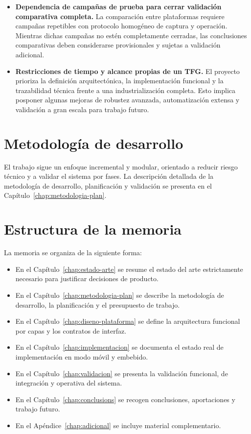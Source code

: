 \begin{itemize}
  \item \textbf{Dependencia de campañas de prueba para cerrar validación comparativa completa.}
  La comparación entre plataformas requiere campañas repetibles con protocolo homogéneo de captura y operación.
  Mientras dichas campañas no estén completamente cerradas, las conclusiones comparativas deben considerarse provisionales y sujetas a validación adicional.

  \item \textbf{Restricciones de tiempo y alcance propias de un TFG.}
  El proyecto prioriza la definición arquitectónica, la implementación funcional y la trazabilidad técnica frente a una industrialización completa.
  Esto implica posponer algunas mejoras de robustez avanzada, automatización extensa y validación a gran escala para trabajo futuro.
\end{itemize}

\section{Metodología de desarrollo}

El trabajo sigue un enfoque incremental y modular, orientado a reducir riesgo técnico y a validar el sistema por fases. La descripción detallada de la metodología de desarrollo, planificación y validación se presenta en el Capítulo~\ref{chap:metodologia-plan}.

\section{Estructura de la memoria}

La memoria se organiza de la siguiente forma:

\begin{itemize}
  \item En el Capítulo~\ref{chap:estado-arte} se resume el estado del arte estrictamente necesario para justificar decisiones de producto.
  \item En el Capítulo~\ref{chap:metodologia-plan} se describe la metodología de desarrollo, la planificación y el presupuesto de trabajo.
  \item En el Capítulo~\ref{chap:diseno-plataforma} se define la arquitectura funcional por capas y los contratos de interfaz.
  \item En el Capítulo~\ref{chap:implementacion} se documenta el estado real de implementación en modo móvil y embebido.
  \item En el Capítulo~\ref{chap:validacion} se presenta la validación funcional, de integración y operativa del sistema.
  \item En el Capítulo~\ref{chap:conclusions} se recogen conclusiones, aportaciones y trabajo futuro.
  \item En el Apéndice~\ref{chap:adicional} se incluye material complementario.
\end{itemize}
